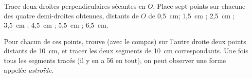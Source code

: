 Trace deux droites perpendiculaires sécantes en $O$. Place sept points
sur chacune des quatre demi-droites obtenues, distants de $O$ de
0,5~cm; 1,5~cm ; 2,5~cm ; 3,5~cm ; 4,5~cm ; 5,5~cm ; 6,5~cm.
\par Pour chacun de ces points, trouve (avec le compas) sur l'autre
droite deux points distants de 10~cm, et tracer les deux segments de
10~cm correspondants. Une fois tous les segments tracés (il y en a 56
en tout), on peut observer une forme appelée {\em astroïde}.
